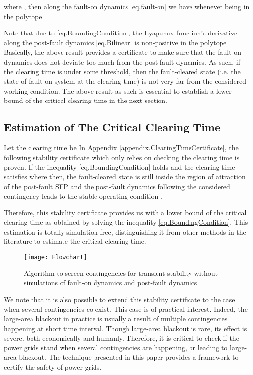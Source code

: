\documentclass[final]{IEEEtran}
\begin{document}
where , then along the fault-on dynamics
\eqref{eq.fault-on} we have  whenever  being in the polytope





Note that due to \eqref{eq.BoundingCondition}, the Lyapunov
function's derivative  along the post-fault dynamics
\eqref{eq.Bilinear} is non-positive in the polytope 
Basically, the above result provides a certificate to make sure
that the fault-on dynamics does not deviate too much from the
post-fault dynamics. As such, if the clearing time is under some
threshold, then the fault-cleared state (i.e. the state of
fault-on system at the clearing time) is not very far from the
considered working condition. The above result as such is
essential to establish a lower bound of the critical clearing time
in the next section.


\subsection{Estimation of The Critical Clearing Time}
\label{sec.EstimationCCT}

Let the clearing time be  In Appendix
\ref{appendix.ClearingTimeCertificate}, the following stability
certificate which only relies on checking the clearing time is
proven. If the inequality \eqref{eq.BoundingCondition} holds and
the clearing time  satisfies
 where
  then, the fault-cleared
state  is still inside the region of
attraction of the post-fault SEP  and the
post-fault dynamics following the considered contingency leads to
the stable operating condition .

Therefore, this stability certificate provides us with a lower
bound of the critical clearing time as  obtained by solving the inequality
\eqref{eq.BoundingCondition}. This estimation is totally
simulation-free,  distinguishing it from other methods in the
literature to estimate the critical clearing time.

\begin{figure}[t!]
\centering
\texttt{[image: Flowchart]}
\caption{Algorithm to screen contingencies for transient stability
without simulations of fault-on dynamics and post-fault
dynamics}\label{flowchart}
\end{figure}




We note that it is also possible to extend this stability
certificate to the case when several contingencies co-exist. This
case is of practical interest. Indeed, the large-area blackout in
practice is usually  a result of multiple contingencies happening
at short time interval. Though large-area blackout is rare, its
effect is severe, both economically and humanly. Therefore, it is
critical  to check if the power grids stand when several
contingencies are happening, or leading to large-area blackout.
The technique presented in this paper provides a framework to
certify the safety of power grids.
\end{document}
